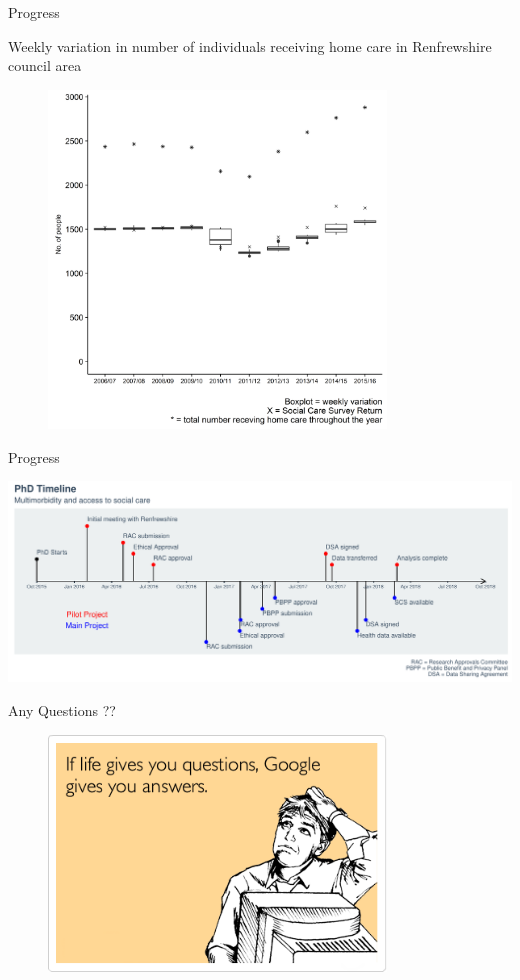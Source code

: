 \documentclass[ignorenonframetext,]{beamer}
\begin{document}
\begin{frame}{Progress}

\begin{block}{Weekly variation in number of individuals receiving home
care in Renfrewshire council area}

\begin{figure}
\centerline{\includegraphics[width=0.8\textwidth, height=0.7\textheight]{images/renfrew.png}}
\end{figure}

\end{block}

\end{frame}

\begin{frame}{Progress}

\includegraphics{Farr-2018_files/figure-beamer/timeline-1.pdf}

\end{frame}

\begin{frame}{Any Questions ??}

\begin{figure}
\centerline{\includegraphics[width=0.8\textwidth, height=0.7\textheight]{images/questions.png}}
\end{figure}

\end{frame}
\end{document}
